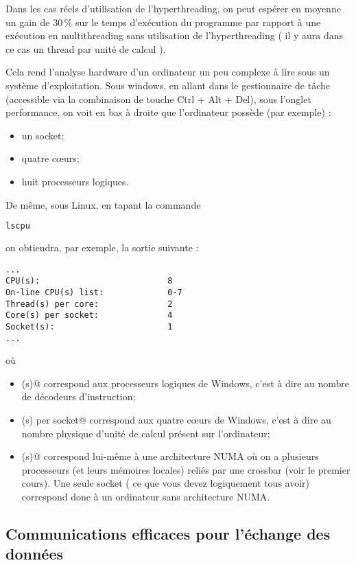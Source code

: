 \documentclass[fleqn,11pt]{article}
\begin{document}
Dans les cas réels d'utilisation de l'hyperthreading, on peut espérer en moyenne  un gain de 30\,\% sur le temps d'exécution du programme par rapport à une exécution en multithreading sans utilisation de
l'hyperthreading ( il y aura dans ce cas un thread par unité de calcul ).

Cela rend l'analyse hardware d'un ordinateur un peu complexe à lire sous un système d'exploitation.
Sous windows, en allant dans le gestionnaire de tâche (accessible via la combinaison de touche Ctrl + Alt + Del), sous l'onglet performance, on voit en bas à droite que l'ordinateur possède (par exemple) :
\begin{itemize}
  \item un socket;
  \item quatre c{\oe}urs;
  \item huit processeurs logiques.
\end{itemize}

De même, sous Linux, en tapant la commande 
\begin{lstlisting}[language=sh]
 lscpu
\end{lstlisting}
on obtiendra, par exemple, la sortie suivante :
\begin{verbatim}
...
CPU(s):                          8
On-line CPU(s) list:             0-7
Thread(s) per core:              2
Core(s) per socket:              4
Socket(s):                       1
...
\end{verbatim}

où 
\begin{itemize}
  \item \verb@CPU(s)@ correspond aux processeurs logiques de Windows, c'est à dire au nombre de décodeurs d'instruction;
  \item \verb@Core(s) per socket@ correspond aux quatre c{\oe}urs de Windows, c'est à dire au nombre physique d'unité de calcul présent sur l'ordinateur;
  \item \verb@Socket(s)@ correspond lui-même à une architecture NUMA où on a plusieurs processeurs (et
  leurs mémoires locales) reliés par une crossbar (voir le premier cours). Une seule socket ( ce que vous
  devez logiquement tous avoir) correspond donc à un ordinateur sans architecture NUMA. 
\end{itemize}

\subsection{Communications efficaces pour l'échange des données}
\end{document}
